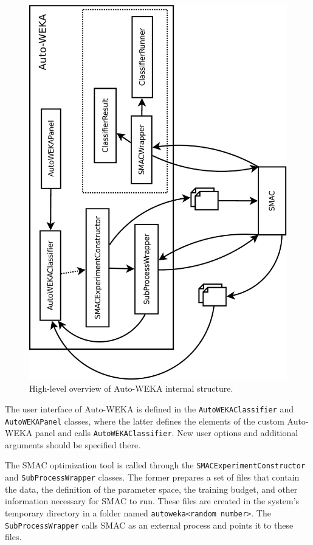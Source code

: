 \documentclass{article}
\begin{document}
\begin{figure}[!ht]
\begin{center}
\includegraphics[angle=-90,width=\textwidth]{devel-overview-crop}
\caption{High-level overview of Auto-WEKA internal structure.}
\label{fig:devel-overview}
\end{center}
\end{figure}

The user interface of Auto-WEKA is defined in the \verb=AutoWEKAClassifier= and
\verb=AutoWEKAPanel= classes, where the latter defines the elements of the
custom Auto-WEKA panel and calls \verb=AutoWEKAClassifier=. New user options and
additional arguments should be specified there.

The SMAC optimization tool is called through the
\verb=SMACExperimentConstructor= and \verb=SubProcessWrapper= classes. The
former prepares a set of files that contain the data, the definition of the
parameter space, the training budget, and other information necessary for SMAC
to run. These files are created in the system's temporary directory in a folder
named \verb=autoweka<random number>=. The \verb=SubProcessWrapper= calls SMAC as
an external process and points it to these files.
\end{document}
